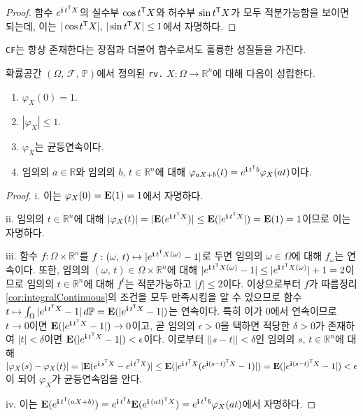 \begin{proof}
    함수 $e^{\mathbf{i}\,t^{\mathsf{T}} X}$의 실수부 $\cos t^{\mathsf{T}} X$와 허수부 $\sin t^{\mathsf{T}} X$가 모두 적분가능함을 보이면 되는데, 이는 $|\cos t^{\mathsf{T}} X|,\,|\sin t^{\mathsf{T}} X|\leq1$에서 자명하다.
\end{proof}

\texttt{CF}는 항상 존재한다는 장점과 더불어 함수로서도 훌륭한 성질들을 가진다.

\begin{theorem}
    확률공간 $(\Omega,\,\mathcal{F},\,\mathbb{P})$에서 정의된 \texttt{rv.} $X:\Omega\to\mathbb{R}^n$에 대해 다음이 성립한다.
    \begin{enumerate}
        \item $\varphi_X(0)=1$.
        \item $|\varphi_X|\leq1$.
        \item $\varphi_X$는 균등연속이다.
        \item 임의의 $a\in\mathbb{R}$와 임의의 $b,\,t\in\mathbb{R}^n$에 대해 $\varphi_{aX+b}(t)=e^{\mathbf{i}\,t^{\mathsf{T}} b}\varphi_X(at)$이다.
    \end{enumerate}
\end{theorem}

\begin{proof}
    i. 이는 $\varphi_X(0)=\mathbf{E}(1)=1$에서 자명하다.

    ii. 임의의 $t\in\mathbb{R}^n$에 대해 $|\varphi_X(t)|=|\mathbf{E}(e^{\mathbf{i}\,t^{\mathsf{T}} X})|\leq\mathbf{E}(|e^{\mathbf{i}\,t^{\mathsf{T}} X}|)=\mathbf{E}(1)=1$이므로 이는 자명하다.

    iii. 함수 $f:\Omega\times\mathbb{R}^n$를 $f:(\omega,\,t)\mapsto|e^{\mathbf{i}\,t^{\mathsf{T}} X(\omega)}-1|$로 두면 임의의 $\omega\in\Omega$에 대해 $f_\omega$는 연속이다. 또한, 임의의 $(\omega,\,t)\in\Omega\times\mathbb{R}^n$에 대해 $|e^{\mathbf{i}\,t^{\mathsf{T}} X(\omega)}-1|\leq|e^{\mathbf{i}\,t^{\mathsf{T}} X(\omega)}|+1=2$이므로 임의의 $t\in\mathbb{R}^n$에 대해 $f^t$는 적분가능하고 $|f|\leq2$이다. 이상으로부터 $f$가 따름정리 \ref{cor:integralContinuous}의 조건을 모두 만족시킴을 알 수 있으므로 함수 $t\mapsto\int_\Omega|e^{\mathbf{i}\,t^{\mathsf{T}} X}-1|\,d\mathbb{P}=\mathbf{E}(|e^{\mathbf{i}\,t^{\mathsf{T}} X}-1|)$는 연속이다. 특히 이가 $0$에서 연속이므로 $t\to0$이면 $\mathbf{E}(|e^{\mathbf{i}\,t^{\mathsf{T}} X}-1|)\to0$이고, 곧 임의의 $\epsilon>0$을 택하면 적당한 $\delta>0$가 존재하여 $|t|<\delta$이면 $\mathbf{E}(|e^{\mathbf{i}\,t^{\mathsf{T}} X}-1|)<\epsilon$이다. 이로부터 $||s-t||<\delta$인 임의의 $s,\,t\in\mathbb{R}^n$에 대해 $|\varphi_X(s)-\varphi_X(t)|=|\mathbf{E}(e^{\mathbf{i}\,s^{\mathsf{T}} X}-e^{\mathbf{i}\,t^{\mathsf{T}} X})|\leq\mathbf{E}(|e^{\mathbf{i}\,t^{\mathsf{T}} X}(e^{\mathbf{i}(s-t)^{\mathsf{T}} X}-1)|)=\mathbf{E}(|e^{\mathbf{i}(s-t)^{\mathsf{T}} X}-1|)<\epsilon$이 되어 $\varphi_X$가 균등연속임을 안다.

    iv. 이는 $\mathbf{E}(e^{\mathbf{i}\,t^{\mathsf{T}}(aX+b)})=e^{\mathbf{i}\,t^{\mathsf{T}} b}\mathbf{E}(e^{\mathbf{i}\,(at)^{\mathsf{T}} X})=e^{\mathbf{i}\,t^{\mathsf{T}} b}\varphi_X(at)$에서 자명하다.
\end{proof}

